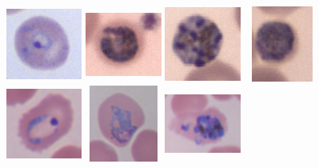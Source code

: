 \documentclass[sensors,review,submit,moreauthors,pdftex,10pt,a4paper]{mdpi}
\begin{document}
\iftrue
\begin{figure}[!t]
	\centering
	\includegraphics[width=2.5cm, height=2.5cm]{img/falciparum_1_ring}
	\includegraphics[width=2.5cm, height=2.5cm]{img/falciparum_2_trophozoiteAge}
	\includegraphics[width=2.5cm, height=2.5cm]{img/falciparum_3_schizont}
	\includegraphics[width=2.5cm, height=2.5cm]{img/falciparum_4_gametocyte}
	\includegraphics[width=2.5cm, height=2.5cm]{img/ovale_1_ring}
	\includegraphics[width=2.5cm, height=2.5cm]{img/ovale_2_trophozoite}
	\includegraphics[width=2.5cm, height=2.5cm]{img/ovale_3_schizont}

\end{figure}
\end{document}
